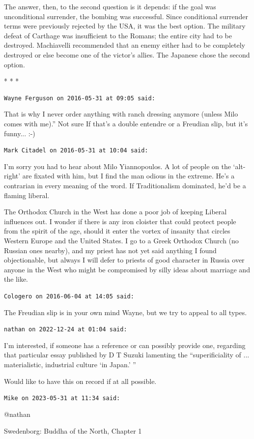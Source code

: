 The answer, then, to the second question is it depends: if the goal was unconditional surrender, the bombing was successful. Since conditional surrender terms were previously rejected by the USA, it was the best option. The military defeat of Carthage was insufficient to the Romans; the entire city had to be destroyed. Machiavelli recommended that an enemy either had to be completely destroyed or else become one of the victor's allies. The Japanese chose the second option.



\begin{center}* * *\end{center}

\begin{footnotesize}
\begin{sffamily}
\texttt{Wayne Ferguson on 2016-05-31 at 09:05 said:} 

That is why I never order anything with ranch dressing anymore (unless Milo comes with me).'' Not sure If that's a double entendre or a Freudian slip, but it's funny... :-)

\hfill

\texttt{Mark Citadel on 2016-05-31 at 10:04 said:}

I'm sorry you had to hear about Milo Yiannopoulos. A lot of people on the `alt-right' are fixated with him, but I find the man odious in the extreme. He's a contrarian in every meaning of the word. If Traditionalism dominated, he'd be a flaming liberal.

The Orthodox Church in the West has done a poor job of keeping Liberal influences out. I wonder if there is any iron cloister that could protect people from the spirit of the age, should it enter the vortex of insanity that circles Western Europe and the United States. I go to a Greek Orthodox Church (no Russian ones nearby), and my priest has not yet said anything I found objectionable, but always I will defer to priests of good character in Russia over anyone in the West who might be compromised by silly ideas about marriage and the like.

\hfill

\texttt{Cologero on 2016-06-04 at 14:05 said:}

The Freudian slip is in your own mind Wayne, but we try to appeal to all types.

\hfill

\texttt{nathan on 2022-12-24 at 01:04 said:}

I'm interested, if someone has a reference or can possibly provide one, regarding that particular essay published by D T Suzuki lamenting the ``superificiality of ... materialistic, industrial culture `in Japan.' ''

Would like to have this on record if at all possible.

\hfill

\texttt{Mike on 2023-05-31 at 11:34 said:}

@nathan

Swedenborg: Buddha of the North, Chapter 1

\end{sffamily}
\end{footnotesize}

